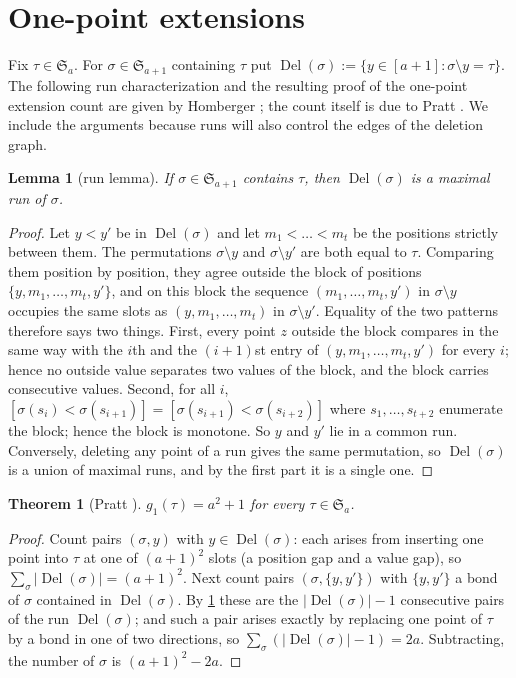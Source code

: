 \documentclass[11pt,reqno]{amsart}
\theoremstyle{plain}
\newtheorem{theorem}{Theorem}[section]
\newtheorem{lemma}[lemma]{Lemma}
\theoremstyle{definition}
\theoremstyle{remark}
\newcommand{\Del}{\operatorname{Del}}
\newcommand{\Sym}{\mathfrak{S}}
\begin{document}
\section{One-point extensions}\label{sec:prelim}

Fix $\tau\in\Sym_a$. For $\sigma\in\Sym_{a+1}$ containing $\tau$ put $\Del(\sigma):=\{y\in[a+1]:\sigma\setminus y=\tau\}$.
The following run characterization and the resulting proof of the
one-point extension count are given by Homberger
\cite[preprint, Lem.~5 and Cor.~8]{Homberger2012}; the count itself is due to Pratt
\cite{Pratt1973}. We include the arguments because runs will also control
the edges of the deletion graph.

\begin{lemma}[run lemma]\label{lem:run}
If $\sigma\in\Sym_{a+1}$ contains $\tau$, then $\Del(\sigma)$ is a maximal run of $\sigma$.
\end{lemma}

\begin{proof}
Let $y<y'$ be in $\Del(\sigma)$ and let $m_1<\dots<m_t$ be the positions strictly between them. The permutations $\sigma\setminus y$ and $\sigma\setminus y'$ are both equal to $\tau$. Comparing them position by position, they agree outside the block of positions $\{y,m_1,\dots,m_t,y'\}$, and on this block the sequence $(m_1,\dots,m_t,y')$ in $\sigma\setminus y$ occupies the same slots as $(y,m_1,\dots,m_t)$ in $\sigma\setminus y'$. Equality of the two patterns therefore says two things. First, every point $z$ outside the block compares in the same way with the $i$th and the $(i+1)$st entry of $(y,m_1,\dots,m_t,y')$ for every $i$; hence no outside value separates two values of the block, and the block carries consecutive values. Second, for all $i$, $[\sigma(s_i)<\sigma(s_{i+1})]=[\sigma(s_{i+1})<\sigma(s_{i+2})]$ where $s_1,\dots,s_{t+2}$ enumerate the block; hence the block is monotone. So $y$ and $y'$ lie in a common run. Conversely, deleting any point of a run gives the same permutation, so $\Del(\sigma)$ is a union of maximal runs, and by the first part it is a single one.
\end{proof}

\begin{theorem}[Pratt \cite{Pratt1973}]\label{thm:pratt}
$g_1(\tau)=a^2+1$ for every $\tau\in\Sym_a$.
\end{theorem}

\begin{proof}
Count pairs $(\sigma,y)$ with $y\in\Del(\sigma)$: each arises from inserting one point into $\tau$ at one of $(a+1)^2$ slots (a position gap and a value gap), so $\sum_\sigma|\Del(\sigma)|=(a+1)^2$. Next count pairs $(\sigma,\{y,y'\})$ with $\{y,y'\}$ a bond of $\sigma$ contained in $\Del(\sigma)$. By \cref{lem:run} these are the $|\Del(\sigma)|-1$ consecutive pairs of the run $\Del(\sigma)$; and such a pair arises exactly by replacing one point of $\tau$ by a bond in one of two directions, so $\sum_\sigma(|\Del(\sigma)|-1)=2a$. Subtracting, the number of $\sigma$ is $(a+1)^2-2a$.
\end{proof}
\end{document}
